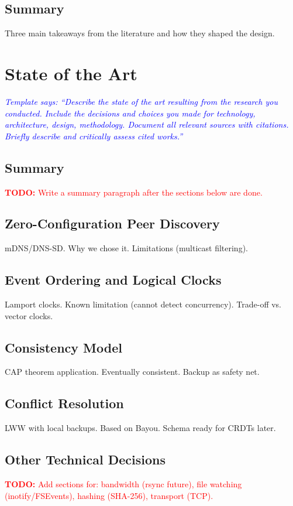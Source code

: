 \documentclass[12pt,oneside]{report}
\newcommand{\note}[1]{\textcolor{blue}{\textit{#1}}}
\newcommand{\todo}[1]{\textcolor{red}{\textbf{TODO:} #1}}
\begin{document}
\section{Summary}
Three main takeaways from the literature and how they shaped the design.

\chapter{State of the Art}

\note{Template says: ``Describe the state of the art resulting from the research you conducted. Include the decisions and choices you made for technology, architecture, design, methodology. Document all relevant sources with citations. Briefly describe and critically assess cited works.''}

\section{Summary}
\todo{Write a summary paragraph after the sections below are done.}

\section{Zero-Configuration Peer Discovery}
mDNS/DNS-SD. Why we chose it. Limitations (multicast filtering).

\section{Event Ordering and Logical Clocks}
Lamport clocks. Known limitation (cannot detect concurrency). Trade-off vs. vector clocks.

\section{Consistency Model}
CAP theorem application. Eventually consistent. Backup as safety net.

\section{Conflict Resolution}
LWW with local backups. Based on Bayou. Schema ready for CRDTs later.

\section{Other Technical Decisions}
\todo{Add sections for: bandwidth (rsync future), file watching (inotify/FSEvents), hashing (SHA-256), transport (TCP).}
\end{document}
